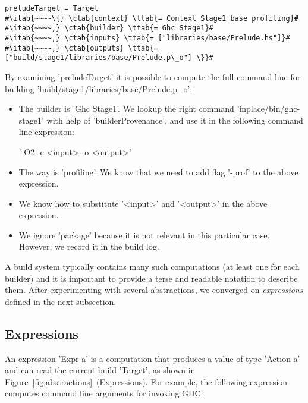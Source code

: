 \begin{lstlisting}
preludeTarget = Target
#\itab{~~~~\{} \ctab{context} \ttab{= Context Stage1 base profiling}#
#\itab{~~~~,} \ctab{builder} \ttab{= Ghc Stage1}#
#\itab{~~~~,} \ctab{inputs} \ttab{= ["libraries/base/Prelude.hs"]}#
#\itab{~~~~,} \ctab{outputs} \ttab{= ["build/stage1/libraries/base/Prelude.p\_o"] \}}#
\end{lstlisting}

\noindent By examining \lst'preludeTarget' it is possible to compute the full
command line for building \lst'build/stage1/libraries/base/Prelude.p_o':
\begin{itemize}
  \item The builder is \lst'Ghc Stage1'. We lookup the right command
  \lst'inplace/bin/ghc-stage1' with help of \lst'builderProvenance', and use it
  in the following command line expression:\vspace{1mm}\\
  \centerline{\!\!\!\!\!\lst'-O2 -c <input> -o <output>'}
  \item The way is \lst'profiling'. We know that we need to add
  flag \lst'-prof' to the above expression.
  \item We know how to substitute \lst'<input>' and \lst'<output>' in the
  above expression.
  \item We ignore \lst'package' because it is not relevant in this particular
  case. However, we record it in the build log.
\end{itemize}

\noindent A build system typically contains many such computations (at least one
for each builder) and it is important to provide a terse and readable notation to
describe them. After experimenting with several abstractions, we converged on
\emph{expressions} defined in the next subsection.

\subsection{Expressions}

An expression \lst'Expr a' is a computation that produces a value of type
\lst'Action a' and can read the current build \lst'Target', as shown in
Figure~\ref{fig:abstractions}~(Expressions). For example,
the following expression computes command line arguments for invoking GHC:

\newcommand{\altab}[1]{\hspace{.05\textwidth}\rlap{#1}}

